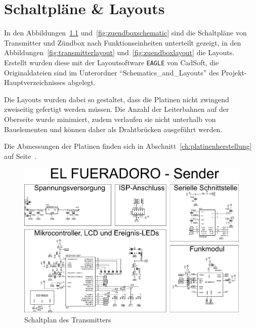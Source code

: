 \documentclass[pdftex, parskip, numbers=noenddot, toc=listof]{scrbook}
\begin{document}
	\chapter{Schaltpläne \& Layouts}

		In den Abbildungen~\ref{fig:transmitterschematic} und~\ref{fig:zuendboxschematic} sind die Schaltpläne von Transmitter und Zündbox nach Funk\-tions\-ein\-heiten unterteilt gezeigt, in den Abbildungen~\ref{fig:transmitterlayout} und~\ref{fig:zuendboxlayout} die Layouts. Erstellt wurden diese mit der Layoutsoftware \texttt{EAGLE} von CadSoft, die Originaldateien sind im Unterordner \enquote{Schematics\_and\_Layouts} des Projekt-Hauptverzeichnisses abgelegt.

		Die Layouts wurden dabei so gestaltet, dass die Platinen nicht zwingend zweiseitig gefertigt werden müssen. Die Anzahl der Leiterbahnen auf der Oberseite wurde minimiert, zudem verlaufen sie nicht unterhalb von Bauelementen und können daher als Drahtbrücken ausgeführt werden.

		Die Abmessungen der Platinen finden sich in Abschnitt~\ref{ch:platinenherstellung} auf Seite~\pageref{ch:platinenherstellung}.

		\begin{figure}
			\centering
			\includegraphics[angle=-90, width=.9\textwidth, keepaspectratio]{Bilder/Transmitterschaltplan}
			\caption{Schaltplan des Transmitters}
			\label{fig:transmitterschematic}
		\end{figure}
\end{document}
